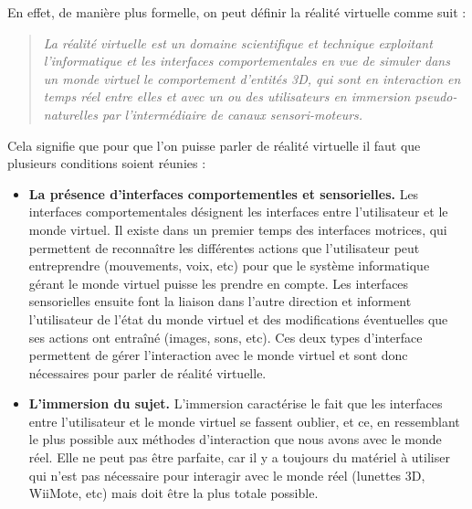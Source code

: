 En effet, de manière plus formelle, on peut définir la réalité virtuelle comme suit :\begin{quote}

\og \emph{La réalité virtuelle est un domaine scientifique et technique exploitant l'informatique et les interfaces comportementales en vue de simuler dans un monde virtuel le comportement d'entités 3D, qui sont en interaction en temps réel entre elles et avec un ou des utilisateurs en immersion pseudo-naturelles par l'intermédiaire de canaux sensori-moteurs.} \fg{}

\end{quote}
Cela signifie que pour que l'on puisse parler de réalité virtuelle il faut que plusieurs conditions soient réunies :	
\begin{itemize}\renewcommand{\labelitemi}{$\bullet$}
\item \textbf{La présence d'interfaces comportementles et sensorielles. }Les interfaces comportementales désignent les interfaces entre l'utilisateur et le monde virtuel. Il existe dans un premier temps des interfaces motrices, qui permettent de reconnaître les différentes actions que l'utilisateur peut entreprendre (mouvements, voix, etc) pour que le système informatique gérant le monde virtuel puisse les prendre en compte. Les interfaces sensorielles ensuite font la liaison dans l'autre direction et informent l'utilisateur de l'état du monde virtuel et des modifications éventuelles que ses actions ont entraîné (images, sons, etc). Ces deux types d'interface permettent de gérer l'interaction avec le monde virtuel et sont donc nécessaires pour parler de réalité virtuelle. 
\item \textbf{L'immersion du sujet.} L'immersion caractérise le fait que les interfaces entre l'utilisateur et le monde virtuel se fassent oublier, et ce, en ressemblant le plus possible aux méthodes d'interaction que nous avons avec le monde réel. Elle ne peut pas être parfaite, car il y a toujours du matériel à utiliser qui n'est pas nécessaire pour interagir avec le monde réel (lunettes 3D, WiiMote, etc) mais doit être la plus totale possible.\\

\end{itemize}


